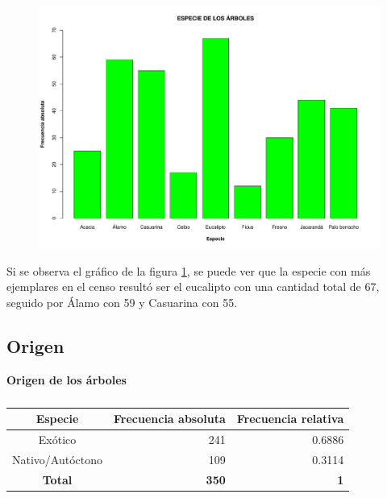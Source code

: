 \documentclass[11pt]{article}
\begin{document}
\newpage

\begin{figure}[h!]
  \begin{center}
    \includegraphics[width=0.9\linewidth]{barrasEspecie.pdf}
    \caption{}
    \label{fig:barrasEspecie}
  \end{center}
\end{figure}

\begin{justify}
  Si se observa el gráfico de la figura \ref{fig:barrasEspecie},
  se puede ver que la especie con más ejemplares en el censo resultó
  ser el eucalipto con una cantidad total de 67, seguido por Álamo
  con 59 y Casuarina con 55.
\end{justify}


\newpage
\subsection{Origen}

\begin{table}[h!]
  \begin{center}
    \caption*{\textbf{Origen de los árboles}}
    \begin{tabular}{| c | r | r |}
      \hline
      \textbf{Especie} & \textbf{Frecuencia absoluta} & 
      \textbf{Frecuencia relativa} \\ \hline
      Exótico	& 241	& 0.6886 \\ \hline
      Nativo/Autóctono & 109 & 0.3114 \\ \hline
      \textbf{Total} & \textbf{350} & \textbf{1} \\ \hline
    \end{tabular}
    \caption{}
    \label{tab:tablaOrigen}
  \end{center}
\end{table}
\end{document}
